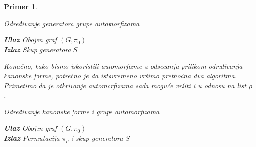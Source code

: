 \documentclass[12pt,oneside]{memoir}
\newtheorem{example}{Primer}
\theoremstyle{definition}
\begin{document}
\begin{example}
  \begin{algorithm}[H]
	  \caption{Određivanje generatora grupe automorfizama}
	  \textbf{Ulaz} Obojen graf $(G, \pi_0)$\\
	  \textbf{Izlaz} Skup generatora $S$
	  \begin{algorithmic}[1]
			\State \Return {$|\nu|$}
		  \EndIf
					\State {}
				\EndIf
			\EndIf
		  \EndFor
			\If {$\zeta = ()$}
				\State {$\zeta \gets \nu$}
			\EndIf

				\State {}
			\EndIf
		  \EndIf
		  \State \Return{$|\nu|$}
		  \EndProcedure
	  \end{algorithmic}
  \end{algorithm}

  Konačno, kako bismo iskoristili automorfizme u odsecanju prilikom određivanja
  kanonske forme, potrebno je da istovremeno vršimo prethodna dva algoritma.
  Primetimo da je otkrivanje automorfizama sada moguće vršiti i u odnosu na
  list $\rho$.

  \begin{algorithm}[H]
	  \caption{Određivanje kanonske forme i grupe automorfizama}
	  \textbf{Ulaz} Obojen graf $(G, \pi_0)$\\
	  \textbf{Izlaz} Permutacija $\pi_\rho$ i skup generatora $S$
	  \begin{algorithmic}[1]
			\State \Return {$|\nu|$}
		  \EndIf
					\State {}
				\EndIf
			\EndIf
		  \EndFor
				\State {$\rho \gets \nu$}
			\EndIf


\end{algorithmic}
\end{algorithm}
\end{example}
\end{document}
